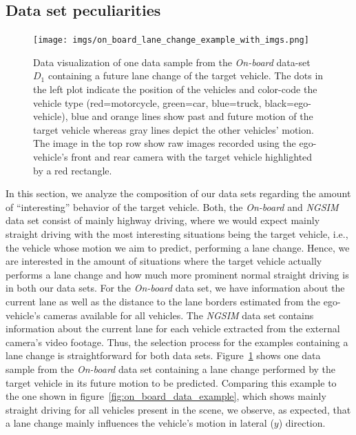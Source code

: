 \subsection{Data set peculiarities}%
\label{subsec:data_set_peculiarities}

\begin{figure}[t]
    \centering
    \texttt{[image: imgs/on\_board\_lane\_change\_example\_with\_imgs.png]}
    \caption{Data visualization of one data sample from the \emph{On-board} data-set $D_1$ containing a future lane change of the target vehicle.
        The dots in the left plot indicate the position of the vehicles and color-code the vehicle type (red=motorcycle, green=car, blue=truck, black=ego-vehicle), blue and orange lines show past and future motion of the target vehicle whereas gray lines depict the other vehicles' motion.
        The image in the top row show raw images recorded using the ego-vehicle's front and rear camera with the target vehicle
    highlighted by a red rectangle.}
    \label{fig:on_board_lane_change_example_with_imgs}
\end{figure}

In this section, we analyze the composition of our data sets regarding the amount of \enquote{interesting} behavior of the target vehicle.
Both, the \emph{On-board} and \emph{\ac{NGSIM}} data set consist of mainly highway driving, where we would expect mainly straight driving with the most interesting situations being the target vehicle, i.e., the vehicle whose motion we aim to predict, performing a lane change.
Hence, we are interested in the amount of situations where the target vehicle actually performs a lane change and how much more prominent normal straight driving is in both our data sets.
For the \emph{On-board} data set, we have information about the current lane as well as the distance to the lane borders estimated from the ego-vehicle's cameras available for all vehicles.
The \emph{\ac{NGSIM}} data set contains information about the current lane for each vehicle extracted from the external camera's video footage.
Thus, the selection process for the examples containing a lane change is straightforward for both data sets.
Figure~\ref{fig:on_board_lane_change_example_with_imgs} shows one data sample from the \emph{On-board} data set containing a lane change performed by the target vehicle in its future motion to be predicted.
Comparing this example to the one shown in figure~\ref{fig:on_board_data_example}, which shows mainly straight driving for all vehicles present in the scene, we observe, as expected, that a lane change mainly influences the vehicle's motion in lateral ($y$) direction.

